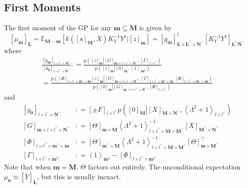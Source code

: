 \documentclass[preprint,12pt]{elsarticle}
\newcommand*{\M}[1]{\ensuremath{#1}\xspace}
\newcommand*{\x}{\times}
\newcommand*{\mi}[1]{\mathbf{#1}}
\newcommand*{\rv}[1]{\mathsf{#1}}
\newcommand*{\te}[2][]{\left\lbrack{#2}\right\rbrack_{#1}}
\newcommand*{\diag}[2][]{\left\langle{#2}\right\rangle_{#1}}
\newcommand*{\prob}[3]{\M{\mathrm{p}\!\left(\left.{#1}\right\vert{#2,#3}\right)}}
\newcommand*{\deq}{\M{\mathrel{\mathop:}=}}
\newcommand*{\ev}[3][]{\mathbb{E}_{#3}^{#1}\!\left\lbrack{#2}\right\rbrack}
\begin{document}
    \subsection{First Moments} \label{sub:GPMom:First}
        The first moment of the GP for any $\mi{m}\subseteq\mi{M}$ is given by
        \begin{equation*}
            \te[\mi{L}]{\mu_{\mi{m}}}
            = \ev{k\!\left(\te[\mi{M}]{\rv{x}},X\right) K_{Y}^{-1} Y^{\dagger} \big\vert \te[\mi{m}]{z}}{\mi{M-m}}
            = \te[\mi{L}\x\mi{L^{\prime\prime}}\x\mi{N^{\prime\prime}}]{g_{\mi{m}}}^{\dagger}
            \te[\mi{L^{\prime\prime}N^{\prime\prime}}]{K_{Y}^{-1} Y^{\dagger}}
        \end{equation*}
        where
        \begin{multline*}
            \frac{\te[l\x l^{\prime\prime}\x\mi{N^{\prime\prime}}]{g_{\mi{m}}}}{\te[l\x l^{\prime\prime}\x\mi{N^{\prime\prime}}]{g_{\mi{0}}}} \deq \frac
            {\prob{\te[\mi{m}]{z}}{\te[\mi{m}\x l\x l^{\prime\prime}\x\mi{N^{\prime\prime}}]{G}}{\te[l\x l^{\prime\prime}]{\Gamma}}}
            {\prob{\te[\mi{m}]{z}}{\te[\mi{m}]{0}}{\diag[\mi{m}^{2}]{1}}} \\
            = \frac{{\prob{\te[l\x l^{\prime\prime}\x\mi{m^{\prime\prime}\x m}]{\Phi}\te[\mi{m}]{z}}{\te[\mi{m}\x l\x l^{\prime\prime}\x\mi{N^{\prime\prime}}]{G}}{\te[l\x l^{\prime\prime}\x\mi{m^{*}\x m^{\prime\prime}}]{\Gamma}\te[l\x l^{\prime\prime}\x \mi{m^{\prime\prime}\x m}]{\Phi}}}}
            {\prob{\te[\mi{m}]{0}}{\te[\mi{m}\x l\x l^{\prime\prime}\x\mi{N^{\prime\prime}}]{G}}
            {\te[l\x l^{\prime\prime}]{\Phi}}}
        \end{multline*}
        and
        \begin{equation*}
            \begin{aligned}
                \te[l\x l^{\prime\prime}\x\mi{N^{\prime\prime}}]{g_{\mi{0}}} 
                &\deq \te[l\x l^{\prime\prime}]{\pm F}
                \prob{\te[\mi{M}]{0}}{\te[\mi{M}\x\mi{N^{\prime\prime}}]{X}}
                {\diag[l\x l^{\prime\prime}]{\Lambda^{2}+1}} \\
                \te[\mi{m}\x l\x l^{\prime\prime}\x\mi{N^{\prime\prime}}]{G} &\deq 
                \te[\mi{m}\x\mi{M}]{\Theta} \diag[l\x l^{\prime\prime}\x\mi{M}\x\mi{M^{\prime\prime}}]{\Lambda^{2}+1}^{-1} \te[\mi{M^{\prime\prime}}\x\mi{N^{\prime\prime}}]{X} \\
                \te[l\x l^{\prime\prime}\x\mi{m^{\prime\prime}}\x\mi{m}]{\Phi} &\deq 
                \te[\mi{m^{\prime\prime}}\x\mi{M}]{\Theta}
                \diag[l\x l^{\prime\prime}\x\mi{M}\x\mi{M^{\prime\prime}}]{\Lambda^{2}+1}^{-1} \te[\mi{m}\x\mi{M^{\prime\prime}}]{\Theta}^{\intercal} \\
                \te[l\x l^{\prime\prime}\x\mi{m}^{2}]{\Gamma} &\deq 
                \diag[\mi{m}^{2}]{1} -
                \te[l\x l^{\prime\prime}\x\mi{m}^{2}]{\Phi}
            \end{aligned}
        \end{equation*}
        Note that when $\mi{m} = \mi{M}$, $\Theta$ factors out entirely.
        The unconditional expectation $\mu_{\mi{0}} \approx \te[\mi{L}]{\bar{Y}}$, but this is usually inexact.
\end{document}
